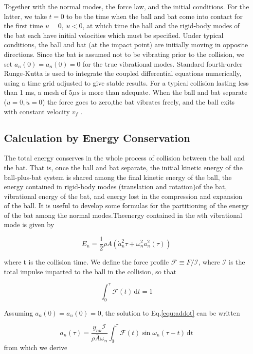 \documentclass[12pt]{article}
\newcommand{\dd}{\ensuremath{\,\mathrm{d}}}
\begin{document}
Together with the normal modes, the force law, and the initial conditions. For the latter, we take $t=0$ to be the time when
the ball and bat come into contact for the first time
$u=0, \ \dot{u}<0$, at which time the ball and the rigid-body modes of the bat each have initial velocities which must be specified. Under typical conditions, the ball and bat (at the impact point) are initially moving in opposite directions. Since the bat is assumed not to be vibrating prior to the collision, we
set $a_n(0)=\dot{a}_n(0)=0$ for the true vibrational modes. Standard fourth-order Runge-Kutta is used to integrate the
coupled differential equations numerically, using a time grid adjusted to give stable results. For a typical
collision lasting less than 1 ms, a mesh of $5 \mu s$ is more than adequate. When the ball and bat separate ($u=0,\dot{u}=0$)
the force goes to zero,the bat vibrates freely, and the ball exits with constant velocity $v_f$ .

\subsection{Calculation by Energy Conservation}

The total energy conserves in the whole process of collision between the ball and the bat. That is, once the ball and
bat separate, the initial kinetic energy of the ball-plus-bat system is shared among the final kinetic energy of the ball, the energy contained in rigid-body modes (translation and rotation)of
the bat, vibrational energy of the bat, and energy
lost in the compression and expansion of the ball. It is useful to develop some formulas for the partitioning of the energy of the bat among the normal modes.Theenergy contained in the $n$th vibrational mode is given by

\begin{equation}
E_n=\frac{1}{2}\rho \bar{A}(\dot{a}_n^2{\tau}+\omega^2_n a^2_n(\tau))
\end{equation}

where t is the collision time. We define the force profile
$\mathcal{F}\equiv F/\mathcal{I}$, where $\mathcal{I}$ is the total impulse imparted to the ball in
the collision, so that

$$\int^\tau_0 \mathcal{F}(t)\dd t=1$$

Assuming
$a_n(0)=\dot{a}_n(0)=0$,
the solution to Eq.\ref{equ:addot} can be written

$$a_n(\tau)=\frac{y_{nk}\mathcal{I}}{\rho \bar{A} \omega_n}\int^\tau_0\mathcal{F}(t)\sin \omega_n(\tau-t)\dd t$$
from which we derive
\end{document}
